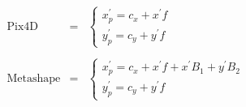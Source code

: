\begin{equation}
  \begin{array}{lll}
  \text{Pix4D} & = &
    \begin{cases}
      x_p^\prime =  c_x + x^\prime f \\
      y_p^\prime =  c_y + y^\prime f 
    \end{cases}
  
  \\ \\

  \text{Metashape} & = &
    \begin{cases}
      x_p^\prime = c_x + x^\prime f + x^\prime B_1 + y^\prime B_2 \\
      y_p^\prime = c_y + y^\prime f 
    \end{cases}

  \end{array}
\label{eq:idp7}
\end{equation}